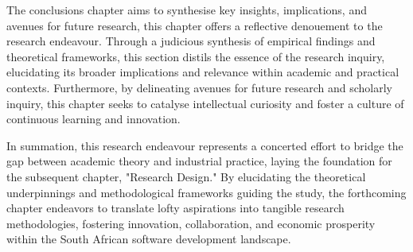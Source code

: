 \par{The conclusions chapter aims to synthesise key insights, implications, and avenues for future research, this chapter offers a reflective denouement to the research endeavour. Through a judicious synthesis of empirical findings and theoretical frameworks, this section distils the essence of the research inquiry, elucidating its broader implications and relevance within academic and practical contexts. Furthermore, by delineating avenues for future research and scholarly inquiry, this chapter seeks to catalyse intellectual curiosity and foster a culture of continuous learning and innovation.}
\par{In summation, this research endeavour represents a concerted effort to bridge the gap between academic theory and industrial practice, laying the foundation for the subsequent chapter, "Research Design." By elucidating the theoretical underpinnings and methodological frameworks guiding the study, the forthcoming chapter endeavors to translate lofty aspirations into tangible research methodologies, fostering innovation, collaboration, and economic prosperity within the South African software development landscape.}